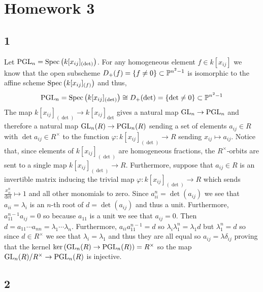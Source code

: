 \documentclass[12pt]{article}
\begin{document}
\section{Homework 3}

\subsection{1}


Let $\PGL_n = \Spec{k[x_{ij}]_{(\det)}}$. For any homogeneous element $f \in k[x_{ij}]$ we know that the open subscheme $D_+(f) = \{ f \neq 0 \} \subset \P^{n^2 - 1}$ is isomorphic to the affine scheme $\Spec{k[x_{ij}]_{(f)}}$ and thus,
\[ \PGL_n = \Spec{k[x_{ij}]_{(\det)}} \cong D_+(\det) = \{ \det \neq 0 \} \subset \P^{n^2 - 1} \]
The map $k[x_{ij}]_{(\det)} \to k[x_{ij}]_{\det}$ gives a natural map $\GL_n \to \PGL_n$ and therefore a natural map $\GL_n(R) \to \PGL_n(R)$ sending a set of elements $a_{ij} \in R$ with $\det{a_{ij}} \in R^\times$ to the function $\varphi : k[x_{ij}]_{(\det)} \to R$ sending $x_{ij} \mapsto a_{ij}$. Notice that, since elements of $k[x_{ij}]_{(\det)}$ are homogeneous fractions, the $R^\times$-orbits are sent to a single map $k[x_{ij}]_{(\det)} \to R$. Furthermore, suppose that $a_{ij} \in R$ is an invertible matrix inducing the trivial map $\varphi : k[x_{ij}]_{(\det)} \to R$ which sends $\frac{x_{ii}^n}{\det} \mapsto 1$ and all other monomials to zero. Since $a_{ii}^n = \det(a_{ij})$ we see that $a_{ii} = \lambda_i$ is an $n$-th root of $d = \det(a_{ij})$ and thus a unit. Furthermore, $a_{11}^{n-1} a_{ij} = 0$ so because $a_{11}$ is a unit we see that $a_{ij} = 0$. Then $d = a_{11} \cdots a_{nn} = \lambda_1 \cdots \lambda_n$. Furthermore, $a_{ii} a_{11}^{n-1} = d$ so $\lambda_i \lambda_1^n = \lambda_1 d$ but $\lambda_1^n = d$ so since $d \in R^\times$ we see that $\lambda_i = \lambda_1$ and thus they are all equal so $a_{ij} = \lambda \delta_{ij}$ proving that the kernel $\ker{(\GL_n(R) \to \PGL_n(R))} = R^\times$ so the map $\GL_n(R)/R^\times \to \PGL_n(R)$ is injective.

\subsection{2}
\end{document}
